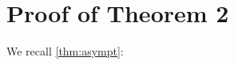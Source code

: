 \documentclass{article}
\begin{document}

\clearpage



\appendix
\newpage
\section{Proof of Theorem 2}
We recall \cref{thm:asympt}:

\asympt*
\end{document}
